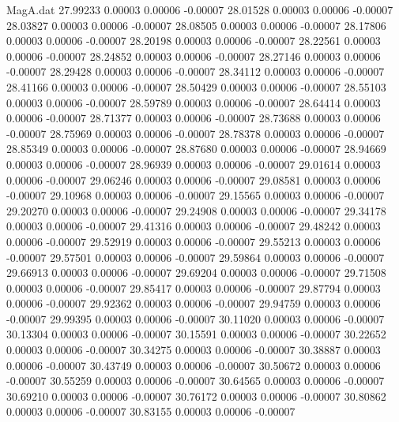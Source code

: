 \begin{filecontents}{MagA.dat}
  27.99233    0.00003    0.00006   -0.00007
  28.01528    0.00003    0.00006   -0.00007
  28.03827    0.00003    0.00006   -0.00007
  28.08505    0.00003    0.00006   -0.00007
  28.17806    0.00003    0.00006   -0.00007
  28.20198    0.00003    0.00006   -0.00007
  28.22561    0.00003    0.00006   -0.00007
  28.24852    0.00003    0.00006   -0.00007
  28.27146    0.00003    0.00006   -0.00007
  28.29428    0.00003    0.00006   -0.00007
  28.34112    0.00003    0.00006   -0.00007
  28.41166    0.00003    0.00006   -0.00007
  28.50429    0.00003    0.00006   -0.00007
  28.55103    0.00003    0.00006   -0.00007
  28.59789    0.00003    0.00006   -0.00007
  28.64414    0.00003    0.00006   -0.00007
  28.71377    0.00003    0.00006   -0.00007
  28.73688    0.00003    0.00006   -0.00007
  28.75969    0.00003    0.00006   -0.00007
  28.78378    0.00003    0.00006   -0.00007
  28.85349    0.00003    0.00006   -0.00007
  28.87680    0.00003    0.00006   -0.00007
  28.94669    0.00003    0.00006   -0.00007
  28.96939    0.00003    0.00006   -0.00007
  29.01614    0.00003    0.00006   -0.00007
  29.06246    0.00003    0.00006   -0.00007
  29.08581    0.00003    0.00006   -0.00007
  29.10968    0.00003    0.00006   -0.00007
  29.15565    0.00003    0.00006   -0.00007
  29.20270    0.00003    0.00006   -0.00007
  29.24908    0.00003    0.00006   -0.00007
  29.34178    0.00003    0.00006   -0.00007
  29.41316    0.00003    0.00006   -0.00007
  29.48242    0.00003    0.00006   -0.00007
  29.52919    0.00003    0.00006   -0.00007
  29.55213    0.00003    0.00006   -0.00007
  29.57501    0.00003    0.00006   -0.00007
  29.59864    0.00003    0.00006   -0.00007
  29.66913    0.00003    0.00006   -0.00007
  29.69204    0.00003    0.00006   -0.00007
  29.71508    0.00003    0.00006   -0.00007
  29.85417    0.00003    0.00006   -0.00007
  29.87794    0.00003    0.00006   -0.00007
  29.92362    0.00003    0.00006   -0.00007
  29.94759    0.00003    0.00006   -0.00007
  29.99395    0.00003    0.00006   -0.00007
  30.11020    0.00003    0.00006   -0.00007
  30.13304    0.00003    0.00006   -0.00007
  30.15591    0.00003    0.00006   -0.00007
  30.22652    0.00003    0.00006   -0.00007
  30.34275    0.00003    0.00006   -0.00007
  30.38887    0.00003    0.00006   -0.00007
  30.43749    0.00003    0.00006   -0.00007
  30.50672    0.00003    0.00006   -0.00007
  30.55259    0.00003    0.00006   -0.00007
  30.64565    0.00003    0.00006   -0.00007
  30.69210    0.00003    0.00006   -0.00007
  30.76172    0.00003    0.00006   -0.00007
  30.80862    0.00003    0.00006   -0.00007
  30.83155    0.00003    0.00006   -0.00007

\end{filecontents}
